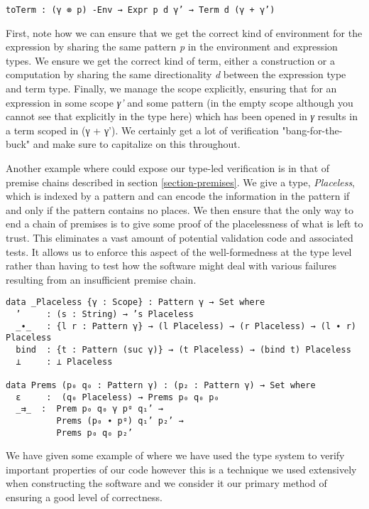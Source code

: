 \begin{verbatim}
toTerm : (γ ⊗ p) -Env → Expr p d γ’ → Term d (γ + γ’)
\end{verbatim}

First, note how we can ensure that we get the correct kind of
environment for the expression by sharing the same pattern \emph{p} in
the environment and expression types. We ensure we get the correct
kind of term, either a construction or a computation by sharing the
same directionality \emph{d} between the expression type and term
type. Finally, we manage the scope explicitly, ensuring that for an
expression in some scope \emph{γ'} and some pattern (in the empty
scope although you cannot see that explicitly in the type here) which
has been opened in \emph{γ} results in a term scoped in (γ + γ'). We
certainly get a lot of verification "bang-for-the-buck" and make sure
to capitalize on this throughout.

Another example where could expose our type-led verification is in
that of premise chains described in section \ref{section-premises}. We
give a type, \emph{Placeless}, which is indexed by a pattern and can
encode the information in the pattern if and only if the pattern
contains no places. We then ensure that the only way to end a chain of
premises is to give some proof of the placelessness of what is left to
trust. This eliminates a vast amount of potential validation code and
associated tests. It allows us to enforce this aspect of the
well-formedness at the type level rather than having to test how the
software might deal with various failures resulting from an insufficient
premise chain.

\begin{verbatim}
data _Placeless {γ : Scope} : Pattern γ → Set where
  ’     : (s : String) → ’s Placeless
  _∙_   : {l r : Pattern γ} → (l Placeless) → (r Placeless) → (l ∙ r) Placeless
  bind  : {t : Pattern (suc γ)} → (t Placeless) → (bind t) Placeless
  ⊥     : ⊥ Placeless

data Prems (p₀ q₀ : Pattern γ) : (p₂ : Pattern γ) → Set where
  ε     :  (q₀ Placeless) → Prems p₀ q₀ p₀
  _⇉_  :  Prem p₀ q₀ γ pᵍ q₁’ →
          Prems (p₀ ∙ pᵍ) q₁’ p₂’ →
          Prems p₀ q₀ p₂’
\end{verbatim}

We have given some example of where we have used the type system to
verify important properties of our code however this is a technique we
used extensively when constructing the software and we consider it our
primary method of ensuring a good level of correctness.


